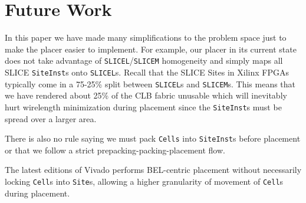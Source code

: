 \section{Future Work}
In this paper we have made many simplifications to the problem space just to make the placer easier to implement.
For example, our placer in its current state does not take advantage of \texttt{SLICEL}/\texttt{SLICEM} homogeneity and simply maps all SLICE \texttt{SiteInst}s onto \texttt{SLICEL}s. 
Recall that the SLICE Sites in Xilinx FPGAs typically come in a 75-25\% split between \texttt{SLICEL}s and \texttt{SLICEM}s. 
This means that we have rendered about 25\% of the CLB fabric unusable which will inevitably hurt wirelength minimization during placement since the \texttt{SiteInst}s must be spread over a larger area. 

There is also no rule saying we must pack \texttt{Cells} into \texttt{SiteInst}s before placement or that we follow a strict prepacking-packing-placement flow. 

The latest editions of Vivado performs BEL-centric placement without necessarily locking \texttt{Cell}s into \texttt{Site}s, allowing a higher granularity of movement of \texttt{Cell}s during placement. 
